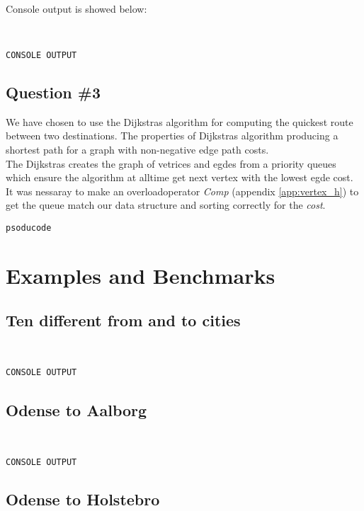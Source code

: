 Console output is showed below:
\begin{lstlisting}


CONSOLE OUTPUT

\end{lstlisting}


\subsection{Question \#3}
We have chosen to use the Dijkstras algorithm for computing the quickest route between two destinations. The properties of Dijkstras algorithm producing a shortest path for a graph with non-negative edge path costs. \\
The Dijkstras creates the graph of vetrices and egdes from a priority queues which ensure the algorithm at alltime  get next vertex with the lowest egde cost. It was nessaray to make an overloadoperator \emph{Comp} (appendix \ref{app:vertex_h}) to get the queue match our data structure and sorting correctly for the \emph{cost}.

\begin{lstlisting}
psoducode
\end{lstlisting}





\section{Examples and Benchmarks}
\subsection{Ten different from and to cities}
\begin{lstlisting}


CONSOLE OUTPUT

\end{lstlisting}


\subsection{Odense to Aalborg}
\begin{lstlisting}


CONSOLE OUTPUT

\end{lstlisting}

	
\subsection{Odense to Holstebro}

